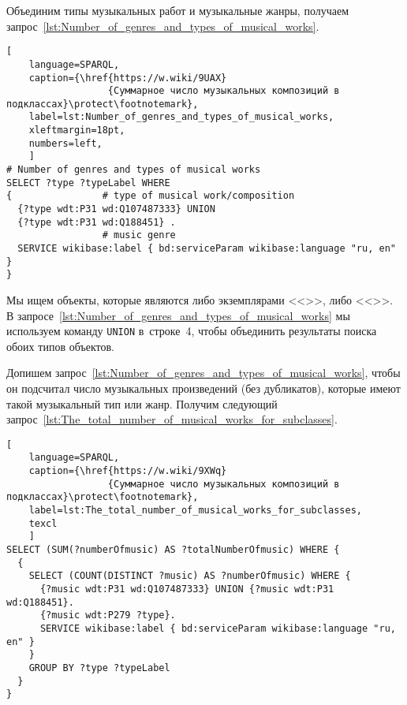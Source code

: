 Объединим типы музыкальных работ и музыкальные жанры, получаем запрос~\ref{lst:Number_of_genres_and_types_of_musical_works}.

\begin{lstlisting}[ 
    language=SPARQL,
    caption={\href{https://w.wiki/9UAX}
                  {Суммарное число музыкальных композиций в подклассах}\protect\footnotemark},
    label=lst:Number_of_genres_and_types_of_musical_works,
    xleftmargin=18pt,
    numbers=left,
    ]
# Number of genres and types of musical works
SELECT ?type ?typeLabel WHERE 
{                # type of musical work/composition
  {?type wdt:P31 wd:Q107487333} UNION 
  {?type wdt:P31 wd:Q188451} .
                 # music genre
  SERVICE wikibase:label { bd:serviceParam wikibase:language "ru, en" }
}
\end{lstlisting}%

Мы ищем объекты, которые являются либо экземплярами <<>>, либо <<>>. В запросе~\ref{lst:Number_of_genres_and_types_of_musical_works} мы используем команду \lstinline|UNION| в~строке~4, чтобы объединить результаты поиска обоих типов объектов.

Допишем запрос~\ref{lst:Number_of_genres_and_types_of_musical_works}, чтобы он подсчитал число музыкальных произведений (без дубликатов), которые имеют такой музыкальный тип или жанр. Получим следующий запрос~\ref{lst:The_total_number_of_musical_works_for_subclasses}.
\begin{lstlisting}[ 
    language=SPARQL,
    caption={\href{https://w.wiki/9XWq}
                  {Суммарное число музыкальных композиций в подклассах}\protect\footnotemark},
    label=lst:The_total_number_of_musical_works_for_subclasses,
    texcl
    ]
SELECT (SUM(?numberOfmusic) AS ?totalNumberOfmusic) WHERE {
  {
    SELECT (COUNT(DISTINCT ?music) AS ?numberOfmusic) WHERE {
      {?music wdt:P31 wd:Q107487333} UNION {?music wdt:P31 wd:Q188451}.
      {?music wdt:P279 ?type}.
      SERVICE wikibase:label { bd:serviceParam wikibase:language "ru, en" }
    }
    GROUP BY ?type ?typeLabel
  }
}
\end{lstlisting}%


